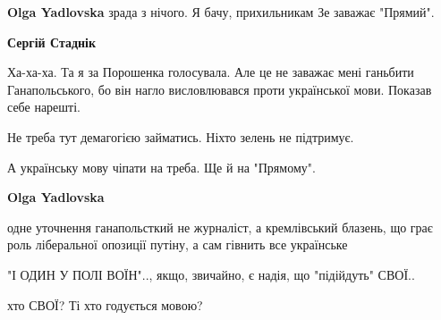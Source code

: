 \begin{itemize}
\begin{itemize}
\textbf{Olga Yadlovska} зрада з нічого. Я бачу, прихильникам Зе заважає "Прямий".

\begin{itemize}
 
\textbf{Сергій Стаднік} 

Ха-ха-ха. Та я за Порошенка голосувала. Але це не заважає мені ганьбити
Ганапольського, бо він нагло висловлювався проти української мови. Показав себе
нарешті.

Не треба тут демагогією займатись. Ніхто зелень не підтримує.

А українську мову чіпати на треба. Ще й на "Прямому".
\end{itemize}

 
\textbf{Olga Yadlovska} 

одне уточнення ганапольсткий не журналіст, а кремлівський блазень, що грає роль
ліберальної опозиції путіну, а сам гівнить все українське

\end{itemize}

 
"І ОДИН У ПОЛІ ВОЇН".., якщо, звичайно, є надія, що "підійдуть" СВОЇ..

\begin{itemize}
 
хто СВОЇ? Ті хто годується мовою?
\begin{itemize}
 

\end{itemize}
\end{itemize}
\end{itemize}
